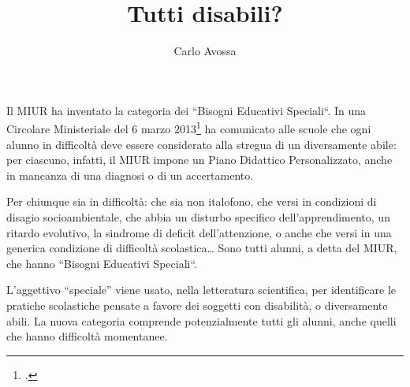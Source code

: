 \author{Carlo Avossa}
\title{Tutti disabili?}
\label{cha:carlovavossa141013}
\maketitle
Il MIUR ha inventato la categoria dei “Bisogni Educativi Speciali“. In una Circolare Ministeriale del 6 marzo 2013\footcite{cm8_2013} ha comunicato alle scuole che ogni alunno in difficoltà deve essere considerato alla stregua di un diversamente abile: per ciascuno, infatti, il MIUR impone un Piano Didattico Personalizzato, anche in mancanza di una diagnosi o di un accertamento.

Per chiunque sia in difficoltà: che sia non italofono, che versi in condizioni di disagio socioambientale, che abbia un disturbo specifico dell'apprendimento, un ritardo evolutivo, la sindrome di deficit dell'attenzione, o anche che versi in una generica condizione di difficoltà scolastica… Sono tutti alunni, a detta del MIUR, che hanno “Bisogni Educativi Speciali“.

L'aggettivo “speciale” viene usato, nella letteratura scientifica, per identificare le pratiche scolastiche pensate a favore dei soggetti con disabilità, o diversamente abili. La nuova categoria comprende potenzialmente tutti gli alunni, anche quelli che hanno difficoltà momentanee.


